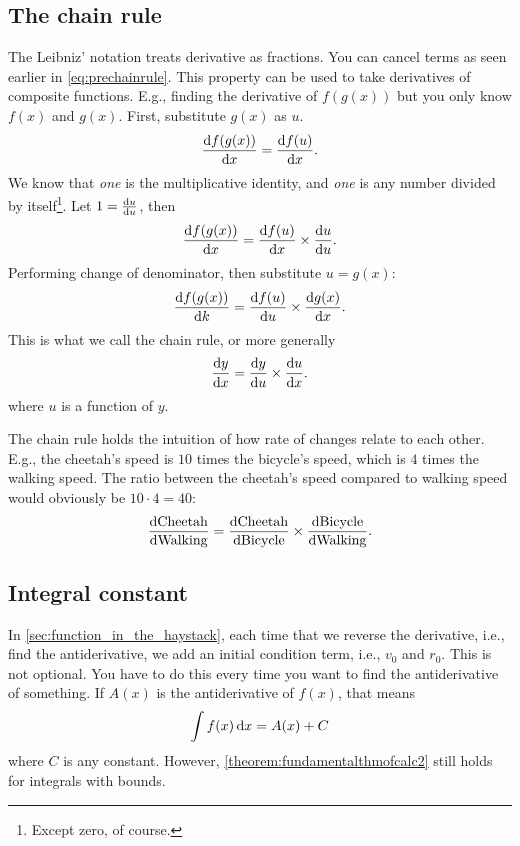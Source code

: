 \subsection{The chain rule}
\label{sec:thechainrule}
The Leibniz' notation treats derivative as fractions. You can cancel terms as seen earlier in \cref{eq:prechainrule}. This property can be used to take derivatives of composite functions. E.g., finding the derivative of $f(g(x))$ but you only know $f(x)$ and $g(x)$. First, substitute $g(x)$ as $u$.
\begin{equation*}
    \odv{f(g(x))}{x} = \odv{f(u)}{x}.
\end{equation*}
We know that \emph{one} is the multiplicative identity, and \emph{one} is any number divided by itself\footnote{Except zero, of course.}. Let $1 = \odv{u}{u}$, then
\begin{equation*}
    \odv{f(g(x))}{x} = \odv{f(u)}{x} \times \odv{u}{u}.
\end{equation*}
Performing change of denominator, then substitute $u = g(x)$:
\begin{equation*}
    \odv{f(g(x))}{k} = \odv{f(u)}{u} \times \odv{g(x)}{x}.
\end{equation*}
This is what we call the chain rule, or more generally
\begin{equation}
    \odv{y}{x} = \odv{y}{u} \times \odv{u}{x}. \label{eq:chainrule}
\end{equation}
where $u$ is a function of $y$.

The chain rule holds the intuition of how rate of changes relate to each other. E.g., the cheetah's speed is $10$ times the bicycle's speed, which is $4$ times the walking speed. The ratio between the cheetah's speed compared to walking speed would obviously be $10\cdot 4 = 40$:
\begin{equation}
    \odv{\textrm{Cheetah}}{\textrm{Walking}} = \odv{\textrm{Cheetah}}{\textrm{Bicycle}} \times \odv{\textrm{Bicycle}}{\textrm{Walking}}.
\end{equation}

\subsection{Integral constant}
In \cref{sec:function_in_the_haystack}, each time that we reverse the derivative, i.e., find the antiderivative, we add an initial condition term, i.e., $v_0$ and $r_0$. This is not optional. You have to do this every time you want to find the antiderivative of something. If $A(x)$ is the antiderivative of $f(x)$, that means
\begin{equation}
    \int f(x)\odif{x} = A(x) + C
\end{equation}
where $C$ is any constant. However, \cref{theorem:fundamentalthmofcalc2} still holds for integrals with bounds.

